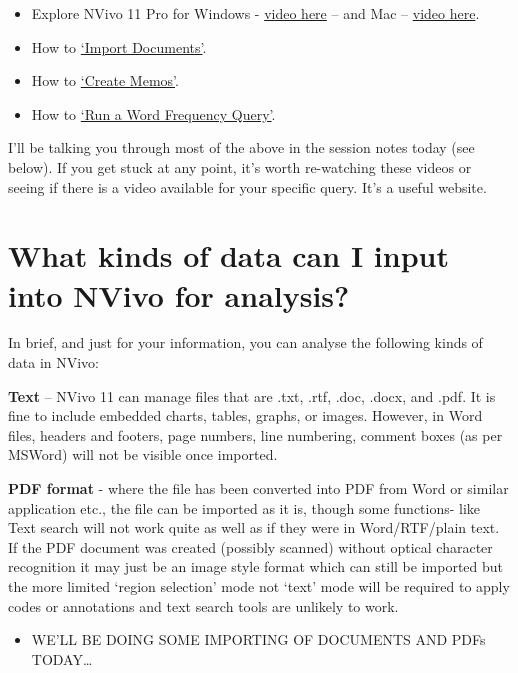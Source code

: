 \documentclass[]{book}
\providecommand{\tightlist}{%
  \setlength{\itemsep}{0pt}\setlength{\parskip}{0pt}}
\theoremstyle{definition}
\theoremstyle{definition}
\theoremstyle{definition}
\theoremstyle{remark}
\begin{document}
\begin{itemize}
\tightlist
\item
  Explore NVivo 11 Pro for Windows -
  \href{https://www.youtube.com/watch?v=S7Z8izUiQjA}{video here} -- and
  Mac -- \href{https://www.youtube.com/watch?v=ONUACL9UcWY}{video here}.
\item
  How to \href{https://www.youtube.com/watch?v=68OOsulWjGM}{`Import
  Documents'}.
\item
  How to \href{https://www.youtube.com/watch?v=6Mkgh2B25RM}{`Create
  Memos'}.
\item
  How to \href{https://www.youtube.com/watch?v=Pm2sgWuGvTI}{`Run a Word
  Frequency Query'}.
\end{itemize}

I'll be talking you through most of the above in the session notes today
(see below). If you get stuck at any point, it's worth re-watching these
videos or seeing if there is a video available for your specific query.
It's a useful website.

\hypertarget{what-kinds-of-data-can-i-input-into-nvivo-for-analysis}{%
\section{What kinds of data can I input into NVivo for
analysis?}\label{what-kinds-of-data-can-i-input-into-nvivo-for-analysis}}

In brief, and just for your information, you can analyse the following
kinds of data in NVivo:

\textbf{Text} -- NVivo 11 can manage files that are .txt, .rtf, .doc,
.docx, and .pdf. It is fine to include embedded charts, tables, graphs,
or images. However, in Word files, headers and footers, page numbers,
line numbering, comment boxes (as per MSWord) will not be visible once
imported.

\textbf{PDF format} - where the file has been converted into PDF from
Word or similar application etc., the file can be imported as it is,
though some functions- like Text search will not work quite as well as
if they were in Word/RTF/plain text. If the PDF document was created
(possibly scanned) without optical character recognition it may just be
an image style format which can still be imported but the more limited
`region selection' mode not `text' mode will be required to apply codes
or annotations and text search tools are unlikely to work.

\begin{itemize}
\tightlist
\item
  WE'LL BE DOING SOME IMPORTING OF DOCUMENTS AND PDFs TODAY\ldots{}
\end{itemize}
\end{document}

